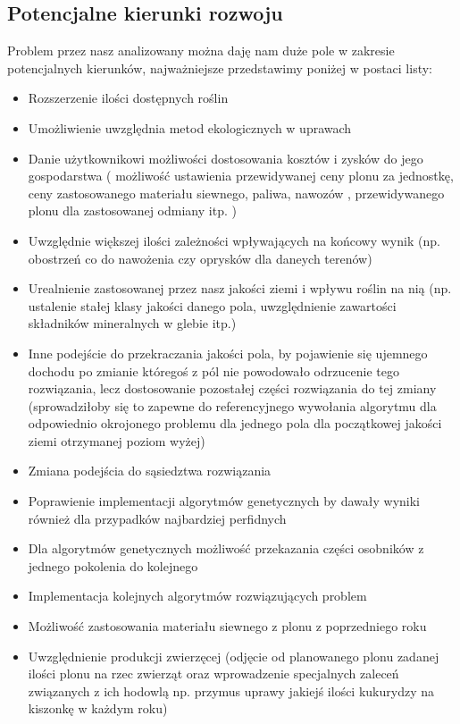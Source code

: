 \documentclass{article}
\begin{document}
\subsection{Potencjalne kierunki rozwoju}
Problem przez nasz analizowany można daję nam duże pole w zakresie potencjalnych kierunków, najważniejsze przedstawimy poniżej w postaci listy:
\begin{itemize}
		\item Rozszerzenie ilości dostępnych roślin

		\item Umożliwienie uwzględnia metod ekologicznych w uprawach

		\item Danie użytkownikowi możliwości dostosowania kosztów i zysków do jego gospodarstwa ( możliwość ustawienia przewidywanej ceny plonu za jednostkę, ceny zastosowanego materiału siewnego, paliwa, nawozów , przewidywanego plonu dla zastosowanej odmiany itp. )

		\item Uwzględnie większej ilości zależności wpływających na końcowy wynik (np. obostrzeń co do nawożenia czy oprysków dla daneych terenów)

		\item Urealnienie zastosowanej przez nasz jakości ziemi i wpływu roślin na nią (np. ustalenie stałej klasy jakości danego pola, uwzględnienie zawartości składników mineralnych w glebie itp.)

		\item Inne podejście do przekraczania jakości pola, by pojawienie się ujemnego dochodu po zmianie któregoś z pól nie powodowało odrzucenie tego rozwiązania, lecz dostosowanie pozostałej części rozwiązania do tej zmiany (sprowadziłoby się to zapewne do referencyjnego wywołania algorytmu dla odpowiednio okrojonego problemu dla jednego pola dla początkowej jakości ziemi otrzymanej poziom wyżej)

		\item Zmiana podejścia do sąsiedztwa rozwiązania

		\item Poprawienie implementacji algorytmów genetycznych by dawały wyniki również dla przypadków najbardziej perfidnych

		\item Dla algorytmów genetycznych możliwość przekazania części osobników z jednego pokolenia do kolejnego
            \item Implementacja kolejnych algorytmów rozwiązujących problem
            \item Możliwość zastosowania materiału siewnego z plonu z poprzedniego roku
            \item Uwzględnienie produkcji zwierzęcej (odjęcie od planowanego plonu zadanej ilości plonu na rzec zwierząt oraz wprowadzenie specjalnych zaleceń związanych z ich hodowlą np. przymus uprawy jakiejś ilości kukurydzy na kiszonkę w każdym roku)

	\end{itemize}
\end{document}

